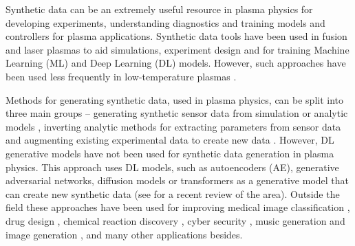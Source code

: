 \documentclass[10pt]{iopart}
\begin{document}
Synthetic data can be an extremely useful resource in plasma physics for developing experiments, understanding diagnostics and training models and controllers for plasma applications. Synthetic data tools have been used in fusion \cite{shiSyntheticDiagnosticsPlatform2016, jacobsenInversionMethodsFastion2016, dalsaniaApplicationMachineLearning2021, juvenTemperatureEstimationFusion2022} and laser plasmas \cite{siminosModelingUltrafastShadowgraphy2016, crillySyntheticNuclearDiagnostics2018, milderImpactNonMaxwellianElectron2019, lewisDeeplearningenabledBayesianInference2021, rodimkovMLBasedDiagnosticsLaser2021} to aid simulations, experiment design and for training Machine Learning (ML) and Deep Learning (DL) models. However, such approaches have been used less frequently in low-temperature plasmas \cite{boffardOpticalEmissionMeasurements2010, liuOHConcentrationTemperature2022, gergsEfficientPlasmasurfaceInteraction2022}.

Methods for generating synthetic data, used in plasma physics, can be split into three main groups -- generating synthetic sensor data from simulation or analytic models \cite{shiSyntheticDiagnosticsPlatform2016, siminosModelingUltrafastShadowgraphy2016, crillySyntheticNuclearDiagnostics2018, milderImpactNonMaxwellianElectron2019, lewisDeeplearningenabledBayesianInference2021, rodimkovMLBasedDiagnosticsLaser2021, juvenTemperatureEstimationFusion2022, gergsEfficientPlasmasurfaceInteraction2022}, inverting analytic methods for extracting parameters from sensor data \cite{boffardOpticalEmissionMeasurements2010, jacobsenInversionMethodsFastion2016, liuOHConcentrationTemperature2022} and augmenting existing experimental data to create new data \cite{dalsaniaApplicationMachineLearning2021}. However, DL generative models have not been used for synthetic data generation in plasma physics. This approach uses DL models, such as autoencoders (AE), generative adversarial networks, diffusion models or transformers as a generative model that can create new synthetic data (see \cite{bond-taylorDeepGenerativeModelling2022} for a recent review of the area). Outside the field these approaches have been used for improving medical image classification \cite{frid-adarSyntheticDataAugmentation2018}, drug design \cite{chengMolecularDesignDrug2021}, chemical reaction discovery \cite{tempkeAutonomousDesignNew2022}, cyber security \cite{lopez-martinVariationalDataGenerative2019}, music generation \cite{choiEncodingMusicalStyle2020} and image generation \cite{rameshHierarchicalTextConditionalImage2022}, and many other applications besides.
\end{document}
